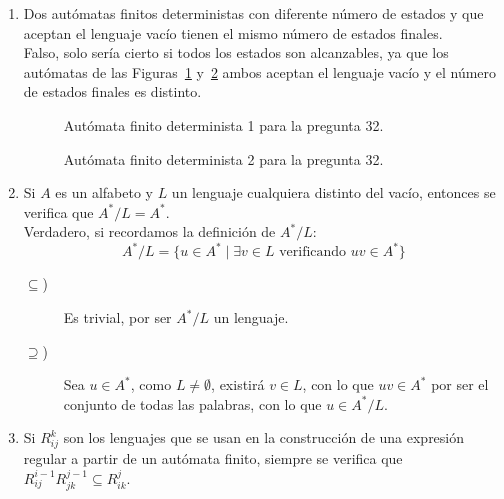 \begin{enumerate}
    \item Dos autómatas finitos deterministas con diferente número de estados y que aceptan el lenguaje vacío tienen el mismo número de estados finales.\\

        Falso, solo sería cierto si todos los estados son alcanzables, ya que los autómatas de las Figuras~\ref{fig:tipo_test32_1} y~\ref{fig:tipo_test32_2} ambos aceptan el lenguaje vacío y el número de estados finales es distinto.
        \begin{figure}[H]
           \centering
           \caption{Autómata finito determinista 1 para la pregunta 32.}
           \label{fig:tipo_test32_1}
       \end{figure}

       \begin{figure}[H]
           \centering
           \caption{Autómata finito determinista 2 para la pregunta 32.}
           \label{fig:tipo_test32_2}
       \end{figure}
    \item Si $A$ es un alfabeto y $L$ un lenguaje cualquiera distinto del vacío, entonces se verifica que $A^\ast / L = A^\ast$.\\

        Verdadero, si recordamos la definición de $A^\ast / L$:
        \begin{equation*}
            A^\ast / L = \{u\in A^\ast \mid \exists v\in L \text{\ verificando\ } uv\in A^\ast\}
        \end{equation*}
        \begin{description}
            \item [$\subseteq$)] Es trivial, por ser $A^\ast / L$ un lenguaje.
            \item [$\supseteq$)] Sea $u\in A^\ast$, como $L\neq \emptyset $, existirá $v\in L$, con lo que $uv\in A^\ast$ por ser el conjunto de todas las palabras, con lo que $u\in A^\ast/L$.
        \end{description}
    \item Si $R^k_{ij}$ son los lenguajes que se usan en la construcción de una expresión regular a partir de un autómata finito, siempre se verifica que $R^{i-1}_{ij}R^{j-1}_{jk}\subseteq R^{j}_{ik}$.\\


\end{enumerate}
